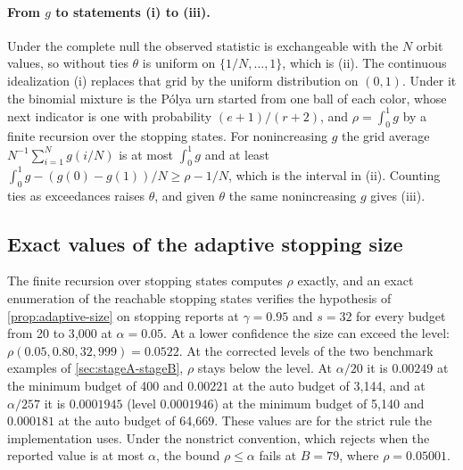 \paragraph{From $g$ to statements (i) to (iii).} Under the complete null the
observed statistic is exchangeable with the $N$ orbit values, so without ties
$\theta$ is uniform on $\{1/N,\dots,1\}$, which is (ii). The continuous
idealization (i) replaces that grid by the uniform distribution on $(0,1)$.
Under it the binomial mixture is the P\'olya urn started from one ball of each
color, whose next indicator is one with probability $(e+1)/(r+2)$, and
$\rho = \int_0^1 g$ by a finite recursion over the stopping states. For
nonincreasing $g$ the grid average $N^{-1}\sum_{i=1}^{N} g(i/N)$ is at most
$\int_0^1 g$ and at least $\int_0^1 g - (g(0)-g(1))/N \ge \rho - 1/N$, which is
the interval in (ii). Counting ties as exceedances raises $\theta$, and given
$\theta$ the same nonincreasing $g$ gives (iii).

\subsection{Exact values of the adaptive stopping size}
\label{app:adaptive-values}

The finite recursion over stopping states computes $\rho$ exactly, and an
exact enumeration of the reachable stopping states verifies the hypothesis of
\cref{prop:adaptive-size} on stopping reports at $\gamma=0.95$ and $s=32$ for
every budget from 20 to 3{,}000 at $\alpha=0.05$. At a lower confidence the
size can exceed the level: $\rho(0.05,0.80,32,999)=0.0522$. At the corrected
levels of the two benchmark examples of \cref{sec:stageA-stageB}, $\rho$ stays
below the level. At $\alpha/20$ it is
$0.00249$ at the minimum budget of 400 and $0.00221$ at the auto budget of
3{,}144, and at $\alpha/257$ it is $0.0001945$ (level $0.0001946$) at the minimum budget of 5{,}140
and $0.000181$ at the auto budget of 64{,}669. These values are for the strict
rule the implementation uses. Under the nonstrict convention, which rejects
when the reported value is at most $\alpha$, the bound $\rho \le \alpha$ fails
at $B=79$, where $\rho=0.05001$.
